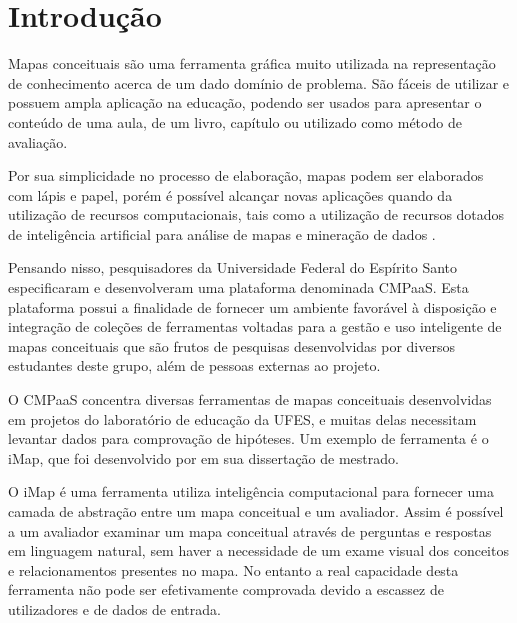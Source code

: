 \documentclass[
	12pt,				%
	openright,			%
	oneside,			%
	a4paper,			%
	english,			%
	french,				%
	spanish,			%
	brazil				%
	]{abntex2}
\begin{document}
\chapter{Introdução}

Mapas conceituais são uma ferramenta gráfica muito utilizada na representação de conhecimento acerca de um dado domínio de problema. São fáceis de utilizar e possuem ampla aplicação na educação, podendo ser usados para apresentar o conteúdo de uma aula, de um livro, capítulo ou utilizado como método de avaliação.

Por sua simplicidade no processo de elaboração, mapas podem ser elaborados com lápis e papel, porém é possível alcançar novas aplicações quando da utilização de recursos computacionais, tais como a utilização de recursos dotados de inteligência artificial para análise de mapas \cite{de2013construindo} e mineração de dados \cite{yoo2012mining}.

Pensando nisso, pesquisadores da Universidade Federal do Espírito Santo especificaram e desenvolveram uma plataforma denominada CMPaaS. Esta plataforma possui a finalidade de fornecer um ambiente favorável à disposição e integração de coleções de ferramentas voltadas para a gestão e uso inteligente de mapas conceituais que são frutos de pesquisas desenvolvidas por diversos estudantes deste grupo, além de pessoas externas ao projeto.

O CMPaaS concentra diversas ferramentas de mapas conceituais desenvolvidas em projetos do laboratório de educação da UFES, e muitas delas necessitam levantar dados para comprovação de hipóteses. Um exemplo de ferramenta é o iMap, que foi desenvolvido por  em sua dissertação de mestrado.  

O iMap é uma ferramenta utiliza inteligência computacional para fornecer uma camada de abstração entre um mapa conceitual e um avaliador. Assim é possível a um avaliador examinar um mapa conceitual através de perguntas e respostas em linguagem natural, sem haver a necessidade de um exame visual dos conceitos e relacionamentos presentes no mapa. No entanto a real capacidade desta ferramenta não pode ser efetivamente comprovada devido a escassez de utilizadores e de dados de entrada.
\end{document}
